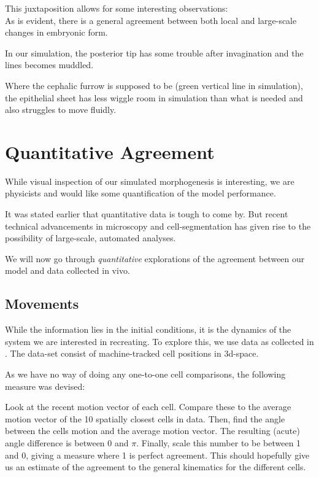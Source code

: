 This juxtaposition allows for some interesting observations:\\
As is evident, there is a general agreement between both local and large-scale changes in embryonic form. 

In our simulation, the posterior tip has some trouble after invagination and the lines becomes muddled.

Where the cephalic furrow is supposed to be (green vertical line in simulation), the epithelial sheet has less wiggle room in simulation than what is needed and also struggles to move fluidly.





\section{Quantitative Agreement}

While visual inspection of our simulated morphogenesis is interesting, we are physicists and would like some quantification of the model performance.

It was stated earlier that quantitative data is tough to come by. But recent technical advancements in microscopy and cell-segmentation has given rise to the possibility of large-scale, automated analyses.\cite{stern2022deconstructing}

We will now go through \textit{quantitative} explorations of the agreement between our model and data collected in vivo. 


\subsection{Movements}

While the information lies in the initial conditions, it is the dynamics of the system we are interested in recreating. To explore this, we use data as collected in . 
The data-set consist of machine-tracked cell positions in 3d-space.

As we have no way of doing any one-to-one cell comparisons, the following measure was devised: 

Look at the recent motion vector of each cell. Compare these to the average motion vector of the 10 spatially closest cells in data. 
Then, find the angle between the cells motion and the average motion vector. The resulting (acute) angle difference is between 0 and $\pi$. Finally, scale this number to be between 1 and 0, giving a measure where 1 is perfect agreement.
This should hopefully give us an estimate of the agreement to the general kinematics for the different cells.

